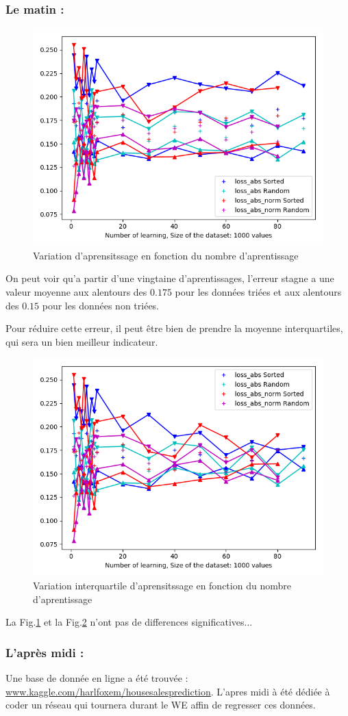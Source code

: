 \subsubsection*{Le matin :}

\begin{figure}[H]
    \center
    \includegraphics[height=\moyen]{sources/data/etfn/graph2.png}
	\caption{Variation d'aprensitssage en fonction du nombre d'aprentissage}
	\label{etfn2}
\end{figure}

On peut voir qu'a partir d'une vingtaine d'aprentissages, l'erreur stagne a une valeur moyenne
aux alentours des $0.175$ pour les données triées et
aux alentours des $0.15$ pour les données non triées.


Pour réduire cette erreur, il peut être bien de prendre la moyenne interquartiles, qui sera un bien meilleur indicateur.

\begin{figure}[H]
    \center
    \includegraphics[height=\moyen]{sources/data/etfn/graph3.png}
	\caption{Variation interquartile d'aprensitssage en fonction du nombre d'aprentissage}
	\label{etfn3}
\end{figure}
La Fig.\ref{etfn2} et la Fig.\ref{etfn3} n'ont pas de differences significatives...

\subsubsection*{L'après midi :}

Une base de donnée en ligne a été trouvée : \url{www.kaggle.com/harlfoxem/housesalesprediction}.
L'apres midi à été dédiée à coder un réseau qui tournera durant le WE affin de regresser ces données.
